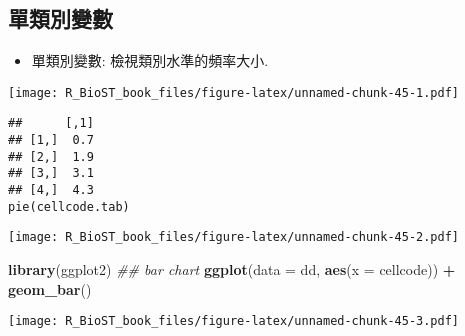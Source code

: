 \documentclass[
]{book}
\newenvironment{Shaded}{\begin{snugshade}}{\end{snugshade}}
\newcommand{\CommentTok}[1]{\textcolor[rgb]{0.56,0.35,0.01}{\textit{#1}}}
\newcommand{\DataTypeTok}[1]{\textcolor[rgb]{0.13,0.29,0.53}{#1}}
\newcommand{\DecValTok}[1]{\textcolor[rgb]{0.00,0.00,0.81}{#1}}
\newcommand{\KeywordTok}[1]{\textcolor[rgb]{0.13,0.29,0.53}{\textbf{#1}}}
\newcommand{\NormalTok}[1]{#1}
\newcommand{\OperatorTok}[1]{\textcolor[rgb]{0.81,0.36,0.00}{\textbf{#1}}}
\newcommand{\StringTok}[1]{\textcolor[rgb]{0.31,0.60,0.02}{#1}}
\providecommand{\tightlist}{%
  \setlength{\itemsep}{0pt}\setlength{\parskip}{0pt}}
\begin{document}
\hypertarget{ux55aeux985eux5225ux8b8aux6578}{%
\subsection{單類別變數}\label{ux55aeux985eux5225ux8b8aux6578}}

\begin{itemize}
\tightlist
\item
  單類別變數: 檢視類別水準的頻率大小.
\end{itemize}

\begin{Shaded}
\end{Shaded}

\texttt{[image: R\_BioST\_book\_files/figure-latex/unnamed-chunk-45-1.pdf]}

\begin{verbatim}
##      [,1]
## [1,]  0.7
## [2,]  1.9
## [3,]  3.1
## [4,]  4.3
pie(cellcode.tab)
\end{verbatim}

\texttt{[image: R\_BioST\_book\_files/figure-latex/unnamed-chunk-45-2.pdf]}

\begin{Shaded}
\begin{Highlighting}[]
\KeywordTok{library}\NormalTok{(ggplot2)}
\CommentTok{\#\# bar chart}
\KeywordTok{ggplot}\NormalTok{(}\DataTypeTok{data =}\NormalTok{ dd, }\KeywordTok{aes}\NormalTok{(}\DataTypeTok{x =}\NormalTok{ cellcode)) }\OperatorTok{+}
\StringTok{  }\KeywordTok{geom\_bar}\NormalTok{()}
\end{Highlighting}
\end{Shaded}

\texttt{[image: R\_BioST\_book\_files/figure-latex/unnamed-chunk-45-3.pdf]}
\end{document}
